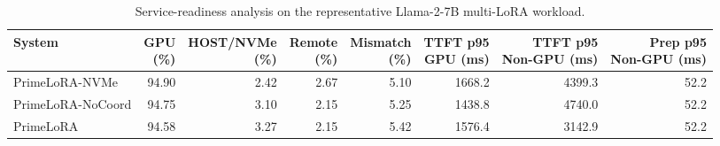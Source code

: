 \begin{table}[t]
\centering
\caption{Service-readiness analysis on the representative Llama-2-7B multi-LoRA workload.}
\label{tab:service_readiness}
\setlength{\tabcolsep}{2.4pt}
\renewcommand{\arraystretch}{1.10}
\begin{tabular}{lrrrrrrr}
\hline
System & \shortstack{GPU\\(\%)} & \shortstack{HOST/NVMe\\(\%)} & \shortstack{Remote\\(\%)} & \shortstack{Mismatch\\(\%)} & \shortstack{TTFT p95\\GPU (ms)} & \shortstack{TTFT p95\\Non-GPU (ms)} & \shortstack{Prep p95\\Non-GPU (ms)} \\
\hline
PrimeLoRA-NVMe & 94.90 & 2.42 & 2.67 & 5.10 & 1668.2 & 4399.3 & 52.2 \\
PrimeLoRA-NoCoord & 94.75 & 3.10 & 2.15 & 5.25 & 1438.8 & 4740.0 & 52.2 \\
PrimeLoRA & 94.58 & 3.27 & 2.15 & 5.42 & 1576.4 & 3142.9 & 52.2 \\
\hline
\end{tabular}
\end{table}

